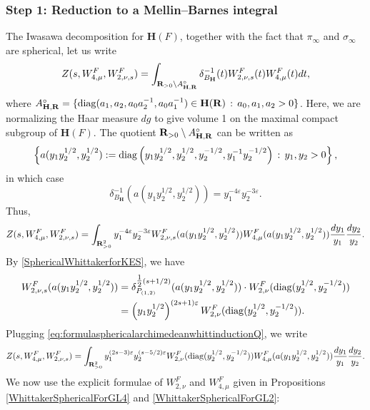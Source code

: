 \documentclass[11pt, reqno]{amsart}
\theoremstyle{plain}
\theoremstyle{definition}
\theoremstyle{remark}
\theoremstyle{plain}
\def\R{{\bf R}}
\def\H{{H}}
\def\epsilon{\varepsilon}
\def\H{\mathbf{H}}
\begin{document}
\subsubsection{Step 1: Reduction to a Mellin--Barnes integral} 
The Iwasawa decomposition for $\H(F)$, together with the fact that $\pi_\infty$ and $\sigma_\infty$ are spherical, let us write 
\[ Z(s, W_{4,\mu}^F, W_{2,\nu,s}^F) 
 = \int_{\R_{>0}\setminus A^\circ_{\H,\R}}\delta_{B_\H}^{-1}(t) W_{2,\nu,s}^F(t)W_{4,\mu}^F(t)dt,\]
 where $A^\circ_{\H,\R} =\{ {\rm diag}(a_1,a_2,a_0a_2^{-1},a_0a_1^{-1}) \in \H(\R)\,:\, a_0,a_1,a_2 >0  \}$. Here, we are normalizing the Haar measure $dg$ to give volume 1 on the maximal compact subgroup of $\H(F)$.  The quotient $\R_{>0}\setminus A^\circ_{\H,\R}$ can be written as $$\left\{a(y_1 y_2^{1/2},y_2^{1/2}) := {\rm diag}\left ( y_1 y_2^{1/2}, y_2^{1/2},y_2^{-1/2}, y_1^{-1} y_2^{-1/2}\right)\,:\, y_1,y_2 >0 \right\},$$ in which case $$ \delta_{B_\H}^{-1}(a(y_1 y_2^{1/2},y_2^{1/2})) = y_1^{-4\epsilon}y_2^{-3\epsilon}.$$
Thus, \[ Z(s, W_{4,\mu}^F, W_{2,\nu,s}^F) 
 = \int_{\R_{>0}^2}y_1^{-4\epsilon}y_2^{-3\epsilon} W_{2,\nu,s}^F(a(y_1 y_2^{1/2},y_2^{1/2}))W_{4,\mu}^F(a(y_1 y_2^{1/2},y_2^{1/2})) \frac{d y_1}{y_1} \frac{d y_2}{y_2}.\]
By \eqref{SphericalWhittakerforKES}, we have 
\begin{align}
     W_{2,\nu,s}^F(a(y_1 y_2^{1/2},y_2^{1/2})) &= \delta_{P_{(1,2)}}^{\tfrac{1}{2}(s+1/2)}(a(y_1 y_2^{1/2},y_2^{1/2})) \cdot W_{2,\nu}^F({\rm diag}(y_2^{1/2},y_2^{-1/2}))\nonumber \\
     &= \left(y_1 y_2^{1/2}\right)^{(2s+1)\epsilon}W_{2,\nu}^F({\rm diag}(y_2^{1/2},y_2^{-1/2})). \label{eq:formulasphericalarchimedeanwhittinductionQ}
\end{align}
Plugging  \eqref{eq:formulasphericalarchimedeanwhittinductionQ}, we write 
\[ Z(s, W_{4,\mu}^F, W_{2,\nu,s}^F) 
 = \int_{\R_{>0}^2}y_1^{(2s-3)\epsilon}y_2^{(s-5/2)\epsilon} W_{2,\nu}^F({\rm diag}(y_2^{1/2},y_2^{-1/2}))W_{4,\mu}^F(a(y_1 y_2^{1/2},y_2^{1/2})) \frac{d y_1}{y_1} \frac{d y_2}{y_2}.\]
We now use the explicit formulae of $W_{2,\nu}^F$ and $W_{4,\mu}^F$ given in Propositions \ref{WhittakerSphericalForGL4} and \ref{WhittakerSphericalForGL2}: 
\end{document}

